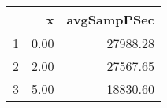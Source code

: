 \begin{table}[h]
\centering
\begin{tabular}{rrr}
  \hline
 & x & avgSampPSec \\ 
  \hline
1 & 0.00 & 27988.28 \\ 
   \hline
2 & 2.00 & 27567.65 \\ 
   \hline
3 & 5.00 & 18830.60 \\ 
   \hline
\end{tabular}
\end{table}
